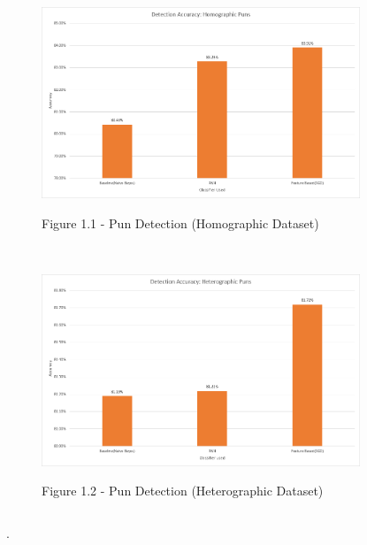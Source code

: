 \documentclass[final]{beamer}
\newlength{\onecolwid}
\newlength{\twocolwid}
\begin{document}
\begin{frame}[t]
\begin{columns}[t]
\begin{column}{\twocolwid}
\begin{columns}[t,totalwidth=\twocolwid]
\begin{column}{\onecolwid}
					\begin{figure}
						\includegraphics[width=0.85\textwidth]{HomographicDetection.png}\\
						\caption{Figure 1.1 - Pun Detection (Homographic Dataset)}
					\end{figure}
					\\
					\vspace{20mm}
					\begin{figure}
						\includegraphics[width=0.85\textwidth]{HeterographicDetection.png}\\
						\caption{Figure 1.2 - Pun Detection (Heterographic Dataset)}
					\end{figure}
				\end{column}
			\end{columns}
			\begin{block}
				{.}
			\end{block}
			\begin{columns}[t,totalwidth=\twocolwid]
				\begin{column}{15mm}\end{column}
				\begin{column}{\onecolwid}


\end{column}
\end{columns}
\end{column}
\end{columns}
\end{frame}
\end{document}
